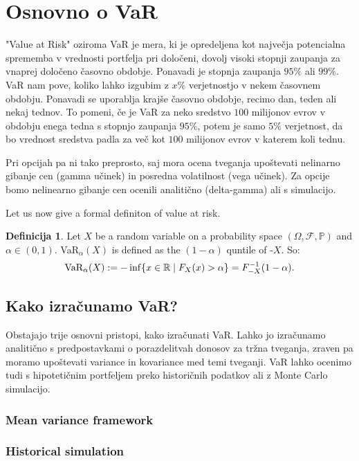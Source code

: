 \documentclass[a4paper, 12pt]{article}
\theoremstyle{definition}
\newtheorem{definicija}{Definicija}
\theoremstyle{plain}
\newcommand{\R}{\mathbb R}
\newcommand{\f}{\mathcal F}
\newcommand{\p}{\mathbb P}
\begin{document}

\section{Osnovno o VaR}

"Value at Risk" oziroma VaR je mera, ki je opredeljena kot največja potencialna sprememba v vrednosti portfelja pri določeni,
dovolj visoki stopnji zaupanja za vnaprej določeno časovno obdobje. Ponavadi je stopnja zaupanja $95\%$ ali $99\%$.
VaR nam pove, koliko lahko izgubim z $x\%$ verjetnostjo v nekem časovnem obdobju. Ponavadi se uporablja
krajše časovno obdobje, recimo dan, teden ali nekaj tednov.
To pomeni, če je VaR za neko sredstvo $100$ milijonov evrov v obdobju enega tedna s stopnjo zaupanja $95\%$,
potem je samo $5\%$ verjetnost, da bo vrednost sredstva padla za več kot $100$ milijonov evrov v katerem koli tednu.

Pri opcijah pa ni tako preprosto, saj mora ocena tveganja  upoštevati nelinarno gibanje cen (gamma učinek)
in posredna volatilnost (vega učinek). %
Za opcije bomo nelinearno gibanje cen ocenili analitično (delta-gamma) ali s simulacijo. 

Let us now give a formal definiton of value at risk. 
\begin{definicija}
Let $X$ be a random variable on a probability space $(\Omega, \f, \p)$ and $\alpha \in (0, 1)$.
VaR$_\alpha(X)$ is defined as the $(1-\alpha)$ quntile of -$X$. So:
$$
\textnormal{VaR}_\alpha(X) := - \inf \{ x \in \R \mid F_X(x) > \alpha \} = F^{-1}_{-X}(1-\alpha).
$$
\end{definicija}


\subsection{Kako izračunamo VaR?}

Obstajajo trije osnovni pristopi, kako izračunati VaR. Lahko jo izračunamo analitično
s predpostavkami o porazdelitvah donosov za tržna tveganja, zraven pa moramo upoštevati variance
in kovariance med temi tveganji. VaR lahko ocenimo tudi s hipotetičnim portfeljem preko historičnih 
podatkov ali z Monte Carlo simulacijo. 

\subsubsection{Mean variance framework}

\subsubsection{Historical simulation}
\end{document}
